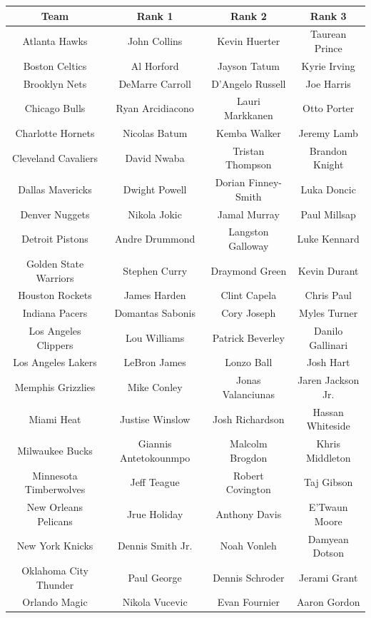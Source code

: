 \documentclass[12pt]{article}%
\begin{document}
\begin{center}
\begin{tabular}{|c|c c c|}
\hline
\textbf{Team} & \textbf{Rank 1} & \textbf{Rank 2} & \textbf{Rank 3}\\
\hline
Atlanta Hawks &John Collins&Kevin Huerter&Taurean Prince\\\hline
Boston Celtics &Al Horford&Jayson Tatum&Kyrie Irving\\\hline
Brooklyn Nets &DeMarre Carroll&D'Angelo Russell&Joe Harris\\\hline
Chicago Bulls &Ryan Arcidiacono&Lauri Markkanen&Otto Porter\\\hline
Charlotte Hornets &Nicolas Batum&Kemba Walker&Jeremy Lamb\\\hline
Cleveland Cavaliers &David Nwaba&Tristan Thompson&Brandon Knight\\\hline
Dallas Mavericks &Dwight Powell&Dorian Finney-Smith&Luka Doncic\\\hline
Denver Nuggets &Nikola Jokic&Jamal Murray&Paul Millsap\\\hline
Detroit Pistons &Andre Drummond&Langston Galloway&Luke Kennard\\\hline
Golden State Warriors &Stephen Curry&Draymond Green&Kevin Durant\\\hline
Houston Rockets &James Harden&Clint Capela&Chris Paul\\\hline
Indiana Pacers &Domantas Sabonis&Cory Joseph&Myles Turner\\\hline
Los Angeles Clippers &Lou Williams&Patrick Beverley&Danilo Gallinari\\\hline
Los Angeles Lakers &LeBron James&Lonzo Ball&Josh Hart\\\hline
Memphis Grizzlies &Mike Conley&Jonas Valanciunas&Jaren Jackson Jr.\\\hline
Miami Heat &Justise Winslow&Josh Richardson&Hassan Whiteside\\\hline
Milwaukee Bucks&Giannis Antetokounmpo&Malcolm Brogdon&Khris Middleton\\\hline
Minnesota Timberwolves &Jeff Teague&Robert Covington&Taj Gibson\\\hline
New Orleans Pelicans &Jrue Holiday&Anthony Davis&E'Twaun Moore\\\hline
New York Knicks &Dennis Smith Jr.&Noah Vonleh&Damyean Dotson\\\hline
Oklahoma City Thunder &Paul George&Dennis Schroder&Jerami Grant\\\hline
Orlando Magic & Nikola Vucevic&Evan Fournier&Aaron Gordon\\\hline

\end{tabular}
\end{center}
\end{document}
